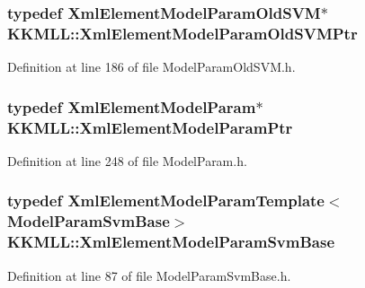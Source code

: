 \subsubsection[{\texorpdfstring{Xml\+Element\+Model\+Param\+Old\+S\+V\+M\+Ptr}{XmlElementModelParamOldSVMPtr}}]{\setlength{\rightskip}{0pt plus 5cm}typedef {\bf Xml\+Element\+Model\+Param\+Old\+S\+VM}$\ast$ {\bf K\+K\+M\+L\+L\+::\+Xml\+Element\+Model\+Param\+Old\+S\+V\+M\+Ptr}}\hypertarget{namespace_k_k_m_l_l_a526fc030c3e8b75edc1ebe096c20de27}{}\label{namespace_k_k_m_l_l_a526fc030c3e8b75edc1ebe096c20de27}


Definition at line 186 of file Model\+Param\+Old\+S\+V\+M.\+h.

\subsubsection[{\texorpdfstring{Xml\+Element\+Model\+Param\+Ptr}{XmlElementModelParamPtr}}]{\setlength{\rightskip}{0pt plus 5cm}typedef {\bf Xml\+Element\+Model\+Param}$\ast$ {\bf K\+K\+M\+L\+L\+::\+Xml\+Element\+Model\+Param\+Ptr}}\hypertarget{namespace_k_k_m_l_l_aad346863c8f91e413a619896455b3822}{}\label{namespace_k_k_m_l_l_aad346863c8f91e413a619896455b3822}


Definition at line 248 of file Model\+Param.\+h.

\subsubsection[{\texorpdfstring{Xml\+Element\+Model\+Param\+Svm\+Base}{XmlElementModelParamSvmBase}}]{\setlength{\rightskip}{0pt plus 5cm}typedef {\bf Xml\+Element\+Model\+Param\+Template}$<${\bf Model\+Param\+Svm\+Base}$>$ {\bf K\+K\+M\+L\+L\+::\+Xml\+Element\+Model\+Param\+Svm\+Base}}\hypertarget{namespace_k_k_m_l_l_a5aa2879f7b12d90cde7a7431299004ea}{}\label{namespace_k_k_m_l_l_a5aa2879f7b12d90cde7a7431299004ea}


Definition at line 87 of file Model\+Param\+Svm\+Base.\+h.

